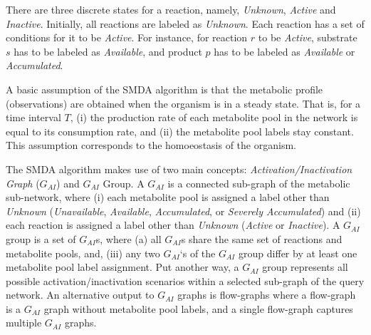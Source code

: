 There are three discrete states for a reaction, namely, \emph{Unknown},
\emph{Active} and \emph{Inactive}. Initially, all reactions are labeled as
\emph{Unknown}.  Each reaction has a set of conditions for it to be
\emph{Active}. For instance, for reaction $r$ to be \emph{Active}, substrate $s$
has to be labeled as \emph{Available}, and product $p$ has to be labeled as
\emph{Available} or \emph{Accumulated}.

A basic assumption of the SMDA algorithm is that the metabolic profile
(observations) are obtained when the organism is in a steady state. That is, for
a time interval $T$, (i) the production rate of each metabolite pool in the
network is equal to its consumption rate, and (ii) the metabolite pool labels
stay constant. This assumption corresponds to the homoeostasis of the organism.

The SMDA algorithm makes use of two main concepts: \emph{Activation/Inactivation
Graph} ($G_{AI}$) and $G_{AI}$ Group. A $G_{AI}$ is a connected sub-graph of the
metabolic sub-network, where (i) each metabolite pool is assigned a label other
than \emph{Unknown} (\emph{Unavailable}, \emph{Available}, \emph{Accumulated},
or \emph{Severely Accumulated}) and (ii) each reaction is assigned a label other
than \emph{Unknown} (\emph{Active} or \emph{Inactive}). A $G_{AI}$ group is a set
of $G_{AI}$s, where (a) all $G_{AI}$s share the same set of reactions and metabolite
pools, and, (iii) any two $G_{AI}$‘s of the $G_{AI}$ group differ by at least one
metabolite pool label assignment.  Put another way, a $G_{AI}$ group represents all
possible activation/inactivation scenarios within a selected sub-graph of the
query network. An alternative output to $G_{AI}$ graphs is flow-graphs where a
flow-graph is a $G_{AI}$ graph without metabolite pool labels, and a single
flow-graph captures multiple $G_{AI}$ graphs.
